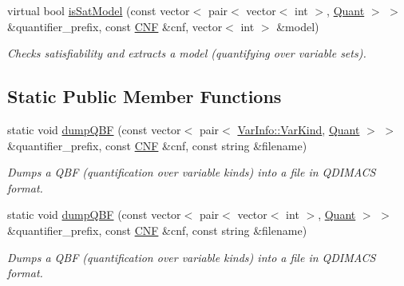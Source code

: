 \begin{DoxyCompactItemize}
virtual bool \hyperlink{classExtQBFSolver_a3add00496f016c2e60a188ce9daa1da1}{is\-Sat\-Model} (const vector$<$ pair$<$ vector$<$ int $>$, \hyperlink{classQBFSolver_ac091e263cb55286cc07b2451bcf4d3c7}{Quant} $>$ $>$ \&quantifier\-\_\-prefix, const \hyperlink{classCNF}{C\-N\-F} \&cnf, vector$<$ int $>$ \&model)
\begin{DoxyCompactList}\small\item\em Checks satisfiability and extracts a model (quantifying over variable sets). \end{DoxyCompactList}\end{DoxyCompactItemize}
\subsection*{Static Public Member Functions}
\begin{DoxyCompactItemize}
\item 
static void \hyperlink{classExtQBFSolver_abebb2acbb5afd5b205254246f39f3e33}{dump\-Q\-B\-F} (const vector$<$ pair$<$ \hyperlink{classVarInfo_a64d1da76cf84fe674e5fef9764ef11cf}{Var\-Info\-::\-Var\-Kind}, \hyperlink{classQBFSolver_ac091e263cb55286cc07b2451bcf4d3c7}{Quant} $>$ $>$ \&quantifier\-\_\-prefix, const \hyperlink{classCNF}{C\-N\-F} \&cnf, const string \&filename)
\begin{DoxyCompactList}\small\item\em Dumps a Q\-B\-F (quantification over variable kinds) into a file in Q\-D\-I\-M\-A\-C\-S format. \end{DoxyCompactList}\item 
static void \hyperlink{classExtQBFSolver_a7e329d1fdce2cf65390930b01cf3a32b}{dump\-Q\-B\-F} (const vector$<$ pair$<$ vector$<$ int $>$, \hyperlink{classQBFSolver_ac091e263cb55286cc07b2451bcf4d3c7}{Quant} $>$ $>$ \&quantifier\-\_\-prefix, const \hyperlink{classCNF}{C\-N\-F} \&cnf, const string \&filename)
\begin{DoxyCompactList}\small\item\em Dumps a Q\-B\-F (quantification over variable kinds) into a file in Q\-D\-I\-M\-A\-C\-S format. \end{DoxyCompactList}\end{DoxyCompactItemize}
